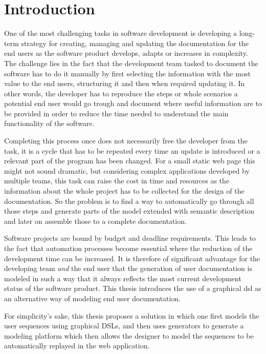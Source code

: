 \chapter{Introduction}\label{ch:intro}

One of the most challenging tasks in software development is developing a long-term strategy for creating, managing and updating the documentation for the end users as the software product develops, adapts or increases in complexity. The challenge lies in the fact that the development team tasked to document the software has to do it manually by first selecting the information with the most value to the end users, structuring it and then when required updating it. In other words, the developer has to reproduce the steps or whole scenarios a potential end user would go trough and document where useful information are to be provided in order to reduce the time needed to understand the main functionality of the software. 

Completing this process once does not necessarily free the developer from the task, it is a cycle that has to be repeated every time an update is introduced or a relevant part of the program has been changed. For a small static web page this might not sound dramatic, but considering complex applications developed by multiple teams, this task can raise the cost in time and resources as the information about the whole project has to be collected for the design of the documentation\cite{IEEE}. So the problem is to find a way to automatically go through all those steps and generate parts of the model extended with semantic description and later on assemble those to a complete documentation.

Software projects are bound by budget and deadline requirements. This leads to the fact that automation processes become essential where the reduction of the development time can be increased. It is therefore of significant advantage for the developing team \textit{and} the end user that the generation of user documentation is modeled in such a way that it always reflects the most current development status of the software product. This thesis introduces the use of a graphical \gls{dsl} as an alternative way of modeling end user documentation.

For simplicity's sake, this thesis proposes a solution in which one first models the user sequences using graphical DSLs, and then uses generators to generate a modeling platform which then allows the designer to model the sequences to be automatically replayed in the web application.

